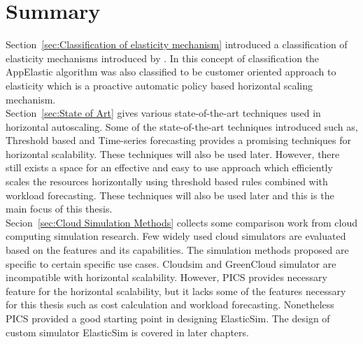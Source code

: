 \section{Summary}
\label{sec:Summary}
Section~\ref{sec:Classification of elasticity mechanism} introduced a classification of elasticity mechanisms introduced by \cite{galante2012survey}. In this concept of classification the AppElastic algorithm was also classified to be customer oriented approach to elasticity which is a proactive automatic policy based horizontal scaling mechanism.
\\
Section~\ref{sec:State of Art} gives various state-of-the-art techniques used in horizontal autoscaling. Some of the state-of-the-art techniques introduced such as, Threshold based and Time-series forecasting provides a promising techniques for horizontal scalability. These techniques will also be used later. However, there still exists a space for an effective and easy to use approach which efficiently scales the resources horizontally using threshold based rules combined with workload forecasting. These techniques will also be used later and this is the main focus of this thesis.
\\
Secion~\ref{sec:Cloud Simulation Methods} collects some comparison work from cloud computing simulation research. Few widely used cloud simulators are evaluated based on the features and its capabilities. The simulation methods proposed are specific to certain specific use cases. Cloudsim and GreenCloud simulator are incompatible with horizontal scalability. However, PICS provides necessary feature for the horizontal scalability,  but it lacks some of the features necessary for this thesis such as cost calculation and workload forecasting. Nonetheless PICS provided a good starting point in designing ElasticSim. The design of custom simulator ElasticSim is covered in later chapters.
